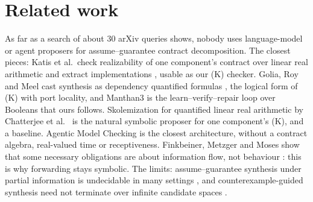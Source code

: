 \documentclass[10pt]{article}
\theoremstyle{tplain}\newtheorem{theorem}{Theorem}\newtheorem{lemma}[theorem]{Lemma}\newtheorem{proposition}[theorem]{Proposition}\newtheorem{corollary}[theorem]{Corollary}\newtheorem{claim}[theorem]{Claim}
\theoremstyle{tdef}\newtheorem{definition}[theorem]{Definition}
\begin{document}
\section{Related work}
As far as a search of about 30 arXiv queries shows, nobody uses language-model or agent proposers for assume--guarantee contract decomposition. The closest pieces: Katis et al.\ check realizability of one component's contract over linear real arithmetic and extract implementations \cite{katis2016synthesis,katis2017validityguided}, usable as our (K) checker. Golia, Roy and Meel cast synthesis as dependency quantified formulas \cite{golia2021program}, the logical form of (K) with port locality, and Manthan3 \cite{golia2023synthesis} is the learn--verify--repair loop over Booleans that ours follows. Skolemization for quantified linear real arithmetic by Chatterjee et al.\ \cite{chatterjee2024quantified} is the natural symbolic proposer for one component's (K), and a baseline. Agentic Model Checking \cite{sun2026agentic} is the closest architecture, without a contract algebra, real-valued time or receptiveness. Finkbeiner, Metzger and Moses show that some necessary obligations are about information flow, not behaviour \cite{finkbeiner2022information}: this is why forwarding stays symbolic. The limits: assume--guarantee synthesis under partial information is undecidable in many settings \cite{bloem2014assumeguarantee}, and counterexample-guided synthesis need not terminate over infinite candidate spaces \cite{jha2014are}.
\end{document}
